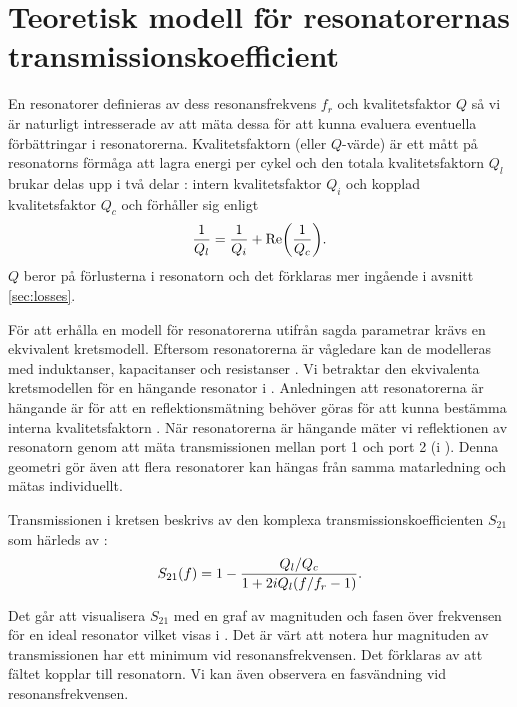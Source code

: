 \documentclass[main.tex]{subfiles}
\begin{document}
\newpage
\section{Teoretisk modell för resonatorernas transmissionskoefficient}
\label{sec:res_teori}


En resonatorer definieras av dess resonansfrekvens $f_r$ och kvalitetsfaktor $Q$ \cite[s. 3]{Boehme2016} så vi är naturligt intresserade av att mäta dessa för att kunna evaluera eventuella förbättringar i resonatorerna. Kvalitetsfaktorn (eller $Q$-värde) är ett mått på resonatorns förmåga att lagra energi per cykel och den totala kvalitetsfaktorn $Q_l$ brukar delas upp i två delar \cite{Probst2015}: intern kvalitetsfaktor $Q_i$ och kopplad kvalitetsfaktor $Q_c$ och förhåller sig enligt 
\begin{equation}
\frac{1}{Q_l}=\frac{1}{Q_i}+\text{Re}\qty(\frac{1}{Q_c}).
\end{equation}
$Q$ beror på förlusterna i resonatorn och det förklaras mer ingående i avsnitt \ref{sec:losses}.

För att erhålla en modell för resonatorerna utifrån sagda parametrar krävs en ekvivalent kretsmodell. Eftersom resonatorerna är vågledare kan de modelleras med induktanser, kapacitanser och resistanser \cite[s. 437]{cheng}. Vi betraktar den ekvivalenta kretsmodellen för en hängande resonator \cite{Boehme2016} i . Anledningen att resonatorerna är hängande är för att en reflektionsmätning behöver göras för att kunna bestämma interna kvalitetsfaktorn \cite{Probst2015}. När resonatorerna är hängande mäter vi reflektionen av resonatorn genom att mäta transmissionen mellan port 1 och port 2 (i ). Denna geometri gör även att flera resonatorer kan hängas från samma matarledning och mätas individuellt.

Transmissionen i kretsen beskrivs av den komplexa transmissionskoefficienten $S_{21}$ som härleds av \citeauthor{Boehme2016} \cite[s. 38]{Boehme2016}:
\begin{equation}
    S_{21}(f)=1-\frac{Q_l/Q_c}{1+2iQ_l\qty(f/f_r-1)}.
\label{eq:S21_ideal}
\end{equation}

Det går att visualisera $S_{21}$ med en graf av magnituden och fasen över frekvensen för en ideal resonator vilket visas i . Det är värt att notera hur magnituden av transmissionen har ett minimum vid resonansfrekvensen. Det förklaras av att fältet kopplar till resonatorn. Vi kan även observera en fasvändning vid resonansfrekvensen.
\end{document}
